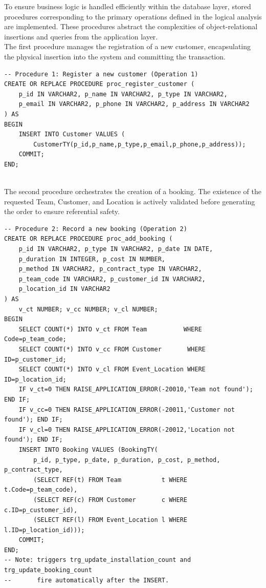 \documentclass[12pt]{article}
\begin{document}
To ensure business logic is handled efficiently within the database layer, stored procedures corresponding to the primary operations defined in the logical analysis are implemented. These procedures abstract the complexities of object-relational insertions and queries from the application layer. 
\\
The first procedure manages the registration of a new customer, encapsulating the physical insertion into the system and committing the transaction.
\\
\begin{lstlisting}
-- Procedure 1: Register a new customer (Operation 1)
CREATE OR REPLACE PROCEDURE proc_register_customer (
    p_id IN VARCHAR2, p_name IN VARCHAR2, p_type IN VARCHAR2,
    p_email IN VARCHAR2, p_phone IN VARCHAR2, p_address IN VARCHAR2
) AS
BEGIN
    INSERT INTO Customer VALUES (
        CustomerTY(p_id,p_name,p_type,p_email,p_phone,p_address));
    COMMIT;
END;
\end{lstlisting}
\\
The second procedure orchestrates the creation of a booking. The existence of the requested Team, Customer, and Location is actively validated before generating the order to ensure referential safety.
\\
\begin{lstlisting}
-- Procedure 2: Record a new booking (Operation 2)
CREATE OR REPLACE PROCEDURE proc_add_booking (
    p_id IN VARCHAR2, p_type IN VARCHAR2, p_date IN DATE,
    p_duration IN INTEGER, p_cost IN NUMBER,
    p_method IN VARCHAR2, p_contract_type IN VARCHAR2,
    p_team_code IN VARCHAR2, p_customer_id IN VARCHAR2,
    p_location_id IN VARCHAR2
) AS
    v_ct NUMBER; v_cc NUMBER; v_cl NUMBER;
BEGIN
    SELECT COUNT(*) INTO v_ct FROM Team          WHERE Code=p_team_code;
    SELECT COUNT(*) INTO v_cc FROM Customer       WHERE ID=p_customer_id;
    SELECT COUNT(*) INTO v_cl FROM Event_Location WHERE ID=p_location_id;
    IF v_ct=0 THEN RAISE_APPLICATION_ERROR(-20010,'Team not found'); END IF;
    IF v_cc=0 THEN RAISE_APPLICATION_ERROR(-20011,'Customer not found'); END IF;
    IF v_cl=0 THEN RAISE_APPLICATION_ERROR(-20012,'Location not found'); END IF;
    INSERT INTO Booking VALUES (BookingTY(
        p_id, p_type, p_date, p_duration, p_cost, p_method, p_contract_type,
        (SELECT REF(t) FROM Team           t WHERE t.Code=p_team_code),
        (SELECT REF(c) FROM Customer       c WHERE c.ID=p_customer_id),
        (SELECT REF(l) FROM Event_Location l WHERE l.ID=p_location_id)));
    COMMIT;
END;
-- Note: triggers trg_update_installation_count and trg_update_booking_count
--       fire automatically after the INSERT.
\end{lstlisting}
\end{document}
